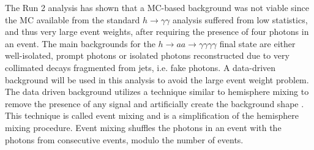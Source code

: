 \documentclass[12pt]{article}
\begin{document}
The Run 2 analysis has shown that a MC-based background was not viable since the MC available from the standard $h \rightarrow \gamma\gamma$ analysis
suffered from low statistics, and thus very large event weights, after requiring the presence of four photons in an event. The main backgrounds for the $h \rightarrow aa \rightarrow \gamma\gamma\gamma\gamma$ final state are either well-isolated, prompt photons or isolated photons reconstructed due to very collimated decays fragmented from jets, i.e. fake photons. A data-driven background will be used in this analysis to avoid the large event weight problem. The data driven background utilizes a technique similar to hemisphere mixing to remove the presence of any signal and artificially create the background shape \cite{hemisphere_mixing}. This technique is called event mixing and is a simplification of the hemisphere mixing procedure.
Event mixing shuffles the photons in an event with the photons from consecutive events, modulo the number of events.\par

\end{document}
